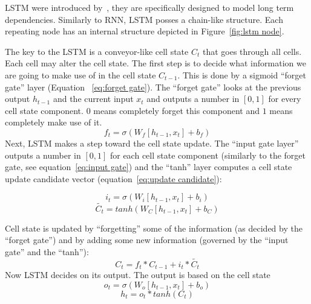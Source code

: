 LSTM were introduced by~\cite{hochreiter1997long}, they are
specifically designed to model long term dependencies. Similarly to
RNN, LSTM posses a chain-like structure. Each repeating node has an
internal structure depicted in Figure~\ref{fig:lstm node}.

The key to the LSTM is a conveyor-like cell state $C_t$ that goes
through all cells.  Each cell may alter the cell state.  The first
step is to decide what information we are going to make use of in the
cell state $C_{t-1}$.  This is done by a sigmoid ``forget gate'' layer
(Equation ~\ref{eq:forget gate}). The ``forget gate'' looks at the
previous output $h_{t-1}$ and the current input $x_t$ and outputs a
number in $[0,1]$ for every cell state component. $0$ means completely
forget this component and $1$ means completely make use of it.
\begin{equation}\label{eq:forget gate}
  f_t = \sigma(W_f[h_{t-1}, x_t] + b_f)
\end{equation}
Next, LSTM makes a step toward the cell state update. The ``input gate
layer'' outputs a number in $[0,1]$ for each cell state component
(similarly to the forget gate, see equation~\ref{eq:input gate}) and
the ``tanh'' layer computes a cell state update candidate vector
(equation~\ref{eq:update candidate}):

\begin{equation}\label{eq:input gate}
  i_t = \sigma(W_i[h_{t-1},x_t] + b_i)
\end{equation}
\begin{equation}\label{eq:update candidate}
  \tilde{C_t} = tanh(W_C[h_{t-1},x_t] + b_C)
\end{equation}

Cell state is updated by ``forgetting'' some of the information (as
decided by the ``forget gate'') and by adding some new information
(governed by the ``input gate'' and the ``tanh''):
\begin{equation}
  C_t = f_t*C_{t-1}+i_t*\tilde{C_t}
\end{equation}
Now LSTM decides on its output.  The output is based on the cell state
\begin{equation}
  o_t = \sigma(W_o[h_{t-1},x_t]+b_o)
\end{equation}
\begin{equation}
  h_t = o_t*tanh(C_t)
\end{equation}

